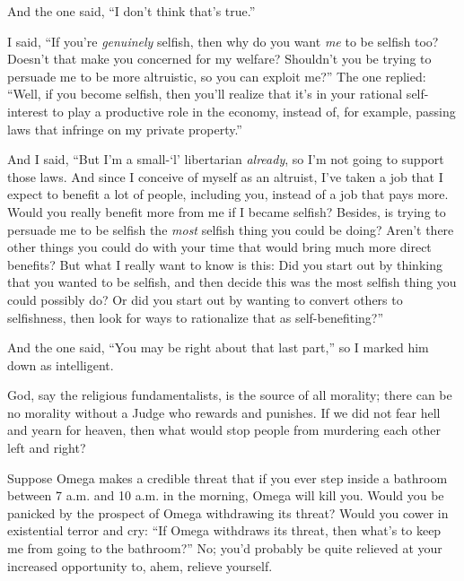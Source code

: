  And the one said, ``I don't think
that's true.''


 I said, ``If you're
\textit{genuinely} selfish, then why do you want \textit{me} to be
selfish too? Doesn't that make you concerned for my
welfare? Shouldn't you be trying to persuade me to be
more altruistic, so you can exploit me?'' The one
replied: ``Well, if you become selfish, then
you'll realize that it's in your
rational self-interest to play a productive role in the economy,
instead of, for example, passing laws that infringe on my private
property.''


 And I said, ``But I'm a
small-`l' libertarian \textit{already},
so I'm not going to support those laws. And since I
conceive of myself as an altruist, I've taken a job
that I expect to benefit a lot of people, including you, instead of a
job that pays more. Would you really benefit more from me if I became
selfish? Besides, is trying to persuade me to be selfish the
\textit{most} selfish thing you could be doing? Aren't
there other things you could do with your time that would bring much
more direct benefits? But what I really want to know is this: Did you
start out by thinking that you wanted to be selfish, and then decide
this was the most selfish thing you could possibly do? Or did you start
out by wanting to convert others to selfishness, then look for ways to
rationalize that as self-benefiting?''


 And the one said, ``You may be right about that
last part,'' so I marked him down as intelligent.

\myendsectiontext


\bigskip



 God, say the religious fundamentalists, is the source of all
morality; there can be no morality without a Judge who rewards and
punishes. If we did not fear hell and yearn for heaven, then what would
stop people from murdering each other left and right? 


 Suppose Omega makes a credible threat that if you ever step inside
a bathroom between 7 a.m. and 10 a.m. in the morning, Omega will kill
you. Would you be panicked by the prospect of Omega withdrawing its
threat? Would you cower in existential terror and cry:
``If Omega withdraws its threat, then
what's to keep me from going to the
bathroom?'' No; you'd probably be
quite relieved at your increased opportunity to, ahem, relieve
yourself.


